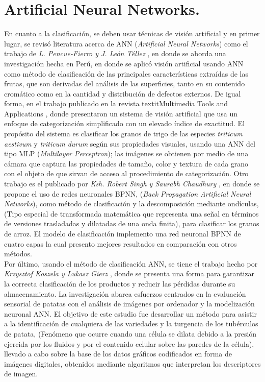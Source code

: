 \section{Artificial Neural Networks.}
	En cuanto a la clasificación, se deben usar técnicas de visión artificial y en primer lugar, se revisó literatura  acerca de ANN (\textit{Artificial Neural Networks}) como el trabajo de \textit{L. Pencue-Fierro y J. León Téllez} \cite{article2}, en donde se aborda una investigación hecha en Perú, en donde se aplicó visión artificial usando ANN como método de clasificación de las principales características extraídas de las frutas, que son derivadas del análisis de las superficies, tanto en su contenido cromático como en la cantidad y distribución de defectos externos. De igual forma, en el trabajo publicado en la revista textit{Multimedia Tools and Applications} \cite{Shrivastava2017}, donde presentaron un sistema de visión artificial que usa un enfoque de categorización simplificado con un elevado índice de exactitud. El propósito del sistema es clasificar los granos de trigo de las especies \textit{triticum aestivum} y \textit{triticum durum} según sus propiedades visuales, usando una ANN del tipo MLP (\textit{Multilayer Perceptron}); las imágenes se obtienen por medio de una cámara que captura las propiedades de tamaño, color y textura de cada grano con el objeto de que sirvan de acceso al procedimiento de categorización. Otro trabajo es el publicado por \textit{Ksh. Robert Singh y Saurabh Chaudhury} \cite{Singh2016}, en donde se propone el uso de redes neuronales BPNN, (\textit{Back Propagation Artificial Neural Networks}), como método de clasificación y la descomposición mediante ondículas, (Tipo especial de transformada matemática que representa una señal en términos de versiones trasladadas y dilatadas de una onda finita), para clasificar los granos de arroz. El modelo de clasificación implemento una red neuronal BPNN de cuatro capas la cual presento mejores resultados en comparación con otros métodos.\\
	
	Por último, usando el método de clasificación ANN, se tiene el trabajo hecho por \textit{Krzysztof Koszela y Lukasz Gierz} \cite{Przybyl2019}, donde se presenta una forma para garantizar la correcta clasificación de los productos y reducir las pérdidas durante su almacenamiento. La investigación abarca esfuerzos centrados en la evaluación sensorial de patatas con el análisis de imágenes por ordenador y la modelización neuronal ANN. El objetivo de este estudio fue desarrollar un método para asistir a la identificación de cualquiera de las variedades y la turgencia de los tubérculos de patata, (Fenómeno que ocurre cuando una célula se dilata debido a la presión ejercida por los fluidos y por el contenido celular sobre las paredes de la célula), llevado a cabo sobre la base de los datos gráficos codificados en forma de imágenes digitales, obtenidos mediante algoritmos que interpretan los descriptores de imagen.\\

